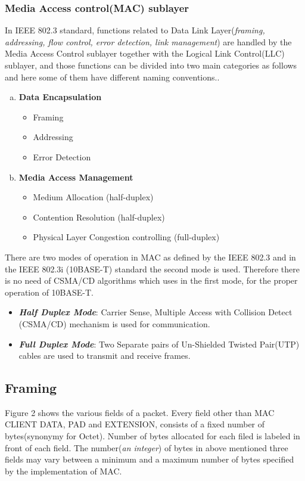 \documentclass[a4paper,11pt]{article}%
\begin{document}
\subsubsection{Media Access control(MAC) sublayer}

In IEEE 802.3 standard, functions related to Data Link Layer(\textit{framing, addressing, flow control, error detection, link management}) are handled by the Media Access Control sublayer together with the Logical Link Control(LLC) sublayer, and those functions can be divided into two main categories as follows and here some of them have different naming conventions.\cite{main}.
\begin{enumerate}[a)]
	\item \textbf{Data Encapsulation}
	\begin{itemize}
		\item Framing
		\item Addressing
		\item Error Detection
	\end{itemize}
	\item \textbf{Media Access Management}
	\begin{itemize}
		\item Medium Allocation (half-duplex)
		\item Contention Resolution (half-duplex)
		\item Physical Layer Congestion controlling (full-duplex)
		
	\end{itemize}
\end{enumerate}

There are two modes of operation in MAC as defined by the IEEE 802.3 and in the IEEE 802.3i (10BASE-T) standard the second mode is used. Therefore there is no need of CSMA/CD algorithms which uses in the first mode, for the proper operation of 10BASE-T.
\begin{itemize}
	\item \textbf{\textit{Half Duplex Mode}}:	Carrier Sense, Multiple Access with Collision Detect (CSMA/CD) mechanism is used for communication.
	\item \textbf{\textit{Full Duplex Mode}}:	Two Separate pairs of Un-Shielded Twisted Pair(UTP) cables are used to transmit and receive frames.
\end{itemize}  

\subsection{Framing}
Figure 2 shows the various fields of a packet. Every field other than MAC CLIENT DATA, PAD and EXTENSION, consists of a fixed number of bytes(synonymy for Octet). Number of bytes allocated for each filed is labeled in front of each field. The number(\textit{an integer}) of bytes in above mentioned three fields may vary between a minimum and a maximum number of bytes specified by the implementation of MAC.
\end{document}

